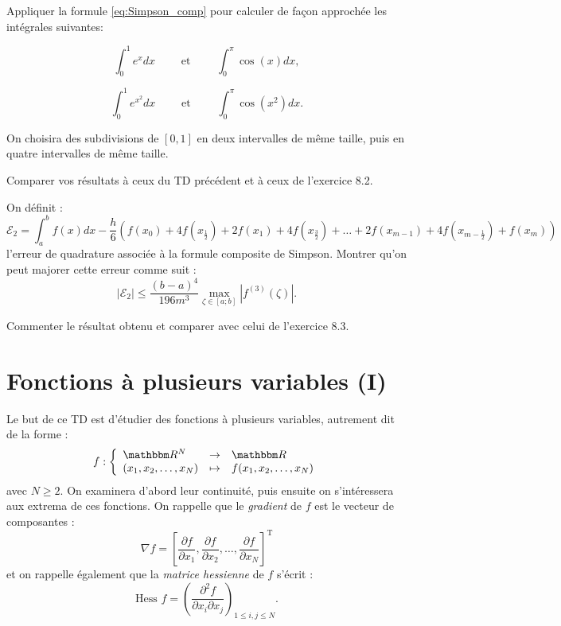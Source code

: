 \medskip

\begin{exercice}

Appliquer la formule \eqref{eq:Simpson_comp} pour calculer de façon approchée les intégrales suivantes:

$$ \int_0^1 e^x dx \qquad \mbox{ et } \qquad \int_0^\pi \cos(x) dx,$$

$$ \int_0^1 e^{x^2} dx \qquad \mbox{ et } \qquad \int_0^\pi \cos(x^2) dx.$$

On choisira des subdivisions de $[0,1]$ en deux intervalles de même taille, puis en quatre intervalles de même taille.

\medskip

Comparer vos résultats à ceux du TD précédent et à ceux de l'exercice 8.2.

\end{exercice}

\medskip

\begin{exercice}

On définit :
\[
\mathcal{E}_2 =
\int_a^b f(x) dx -
\frac{h}{6} \left (
f(x_0) + 4f(x_{\frac12}) + 2 f(x_1) + 4f(x_{\frac32}) +
\ldots + 2f(x_{m-1}) + 4 f(x_{m-\frac12}) + f(x_m)
\right )
\]
l'erreur de quadrature associée à la formule composite de Simpson. Montrer qu'on peut majorer cette erreur comme suit :
\[
| \mathcal{E}_2 | \leq \frac{(b-a)^4}{196 m^3} \max_{\zeta\in[a;b]} |f^{(3)}(\zeta)|.
\]

Commenter le résultat obtenu et comparer avec celui de l'exercice 8.3.

\end{exercice}

\newpage

\section{Fonctions à plusieurs variables (I)}

Le but de ce TD est d'étudier des fonctions à plusieurs variables, autrement dit de la forme :
\[
f : \left \{ 
\begin{array}{lcl}
\eR^N & \rightarrow & \eR \\
(x_1,x_2,\ldots,x_N) & \mapsto & f(x_1,x_2,\ldots,x_N)
\end{array}
\right.
\]
avec $N \geq 2$. On examinera d'abord leur continuité, puis ensuite on s'intéressera aux extrema de ces fonctions.
On rappelle que le \emph{gradient} de $f$ est le vecteur de composantes :
\[
\nabla f = \left [ \frac{\partial f}{\partial x_1} , 
\frac{\partial f}{\partial x_2} , \ldots , \frac{\partial f}{\partial x_N} \right ]^\mathrm{T}
\]
et on rappelle également que la \emph{matrice hessienne} de $f$ s'écrit :
\[
\mbox{Hess } f = \left ( \frac{\partial^2 f}{\partial x_i \partial x_j} \right )_{1\leq i,j \leq N}.
\]

